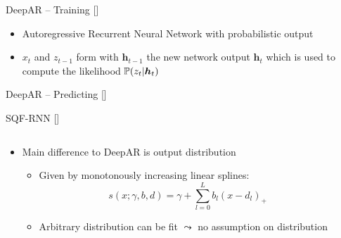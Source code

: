 \documentclass[10pt,aspectratio=169]{beamer}
\begin{document}
\begin{frame}[fragile]{DeepAR -- Training [\cite{Salinas2020}]}
    \begin{center}
        
    \end{center}
    \begin{itemize}
        \item Autoregressive Recurrent Neural Network with probabilistic output
        \item \(x_t\) and \(z_{t-1}\) form with \(\boldsymbol{h}_{t-1}\) the new network output \(\boldsymbol{h}_t\)
        which is used to compute the likelihood \(\P(z_t | \boldsymbol{h}_t)\)
    \end{itemize}
\end{frame}

\begin{frame}[fragile]{DeepAR -- Predicting [\cite{Salinas2020}]}
    \begin{center}
        
    \end{center}
    \begin{itemize}
    \end{itemize}
\end{frame}

\begin{frame}{SQF-RNN [\cite{Gasthaus2019}]}
    \begin{columns}
    \begin{column}{0.6\textwidth}
    \begin{itemize}
        \item Main difference to DeepAR is output distribution
        \begin{itemize}
            \item Given by monotonously increasing linear splines: 
            \[ s(x; \gamma, b, d) = \gamma + \sum_{l=0}^L b_l (x - d_l)_+ \]
            \item Arbitrary distribution can be fit \(\leadsto\) no assumption on distribution
        \end{itemize}
    \end{itemize}
    \end{column}

    \begin{column}{0.35\textwidth}
        
    \end{column}
    \end{columns}
\end{frame}
\end{document}
